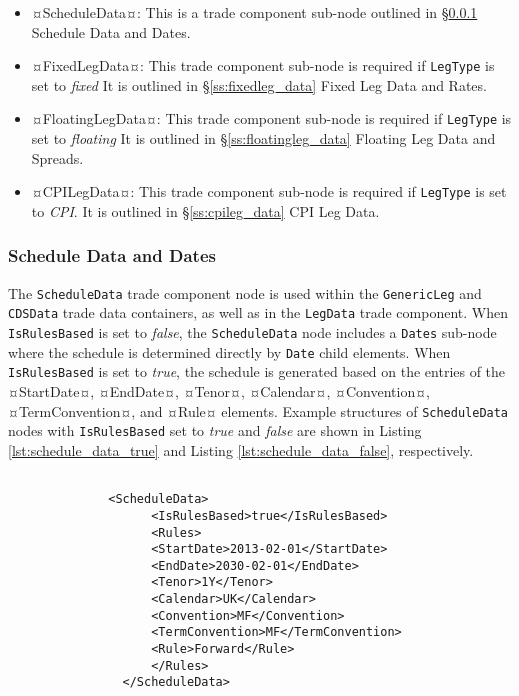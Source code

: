 \begin{itemize}
{\begin{lstlisting}[caption=Notionals, label=lst:notionals]
\end{lstlisting}
}


\item ¤ScheduleData¤: This is a trade component sub-node outlined in \S \ref{ss:schedule_data} Schedule Data and Dates.  
\item ¤FixedLegData¤: This trade component sub-node is required if \lstinline!LegType! is set to \emph{fixed} It is outlined in \S \ref{ss:fixedleg_data} Fixed Leg Data and Rates. 
\item ¤FloatingLegData¤: This trade component sub-node is required if \lstinline!LegType! is set to \emph{floating} It is outlined in \S \ref{ss:floatingleg_data} Floating Leg Data and Spreads.
\item ¤CPILegData¤: This trade component sub-node is required if \lstinline!LegType! is set to \emph{CPI}. It is outlined in \S \ref{ss:cpileg_data} CPI Leg Data.
\end{itemize}






\subsubsection{Schedule Data and Dates}
\label{ss:schedule_data}

The \lstinline!ScheduleData! trade component node is used within the \lstinline!GenericLeg! and \lstinline!CDSData! trade data containers, as well as in the \lstinline!LegData! trade component. When \lstinline!IsRulesBased! is set to \emph{false}, the \lstinline!ScheduleData! node includes a \lstinline!Dates! sub-node  where the schedule is determined directly by  \lstinline!Date! child elements. When \lstinline!IsRulesBased! is set to \emph{true}, the schedule is generated based on the entries of the ¤StartDate¤, ¤EndDate¤, ¤Tenor¤, ¤Calendar¤,  ¤Convention¤, ¤TermConvention¤, and  ¤Rule¤ elements.
Example structures of  \lstinline!ScheduleData! nodes with \lstinline!IsRulesBased! set to \emph{true} and \emph{false} are shown in Listing \ref{lst:schedule_data_true} and Listing \ref{lst:schedule_data_false}, respectively.

{\footnotesize
\begin{lstlisting}[caption=ScheduleData with IsRulesBased:  true, label=lst:schedule_data_true]

              <ScheduleData>
                    <IsRulesBased>true</IsRulesBased>
                    <Rules>
                    <StartDate>2013-02-01</StartDate>
                    <EndDate>2030-02-01</EndDate>
                    <Tenor>1Y</Tenor>
                    <Calendar>UK</Calendar>
                    <Convention>MF</Convention>
                    <TermConvention>MF</TermConvention>
                    <Rule>Forward</Rule>
                    </Rules>
                </ScheduleData>

\end{lstlisting}
}

